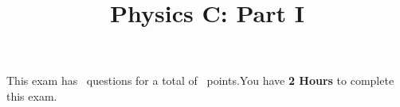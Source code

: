 

\usepackage{color}
\lstset{numbers=left}


\printanswers

\title{Physics C: Part I}
\maketitle



\begin{center}
    This exam has \numquestions\ questions for a total of \numpoints\
    points.You have {\bf 2 Hours} to complete this exam.
\end{center}




